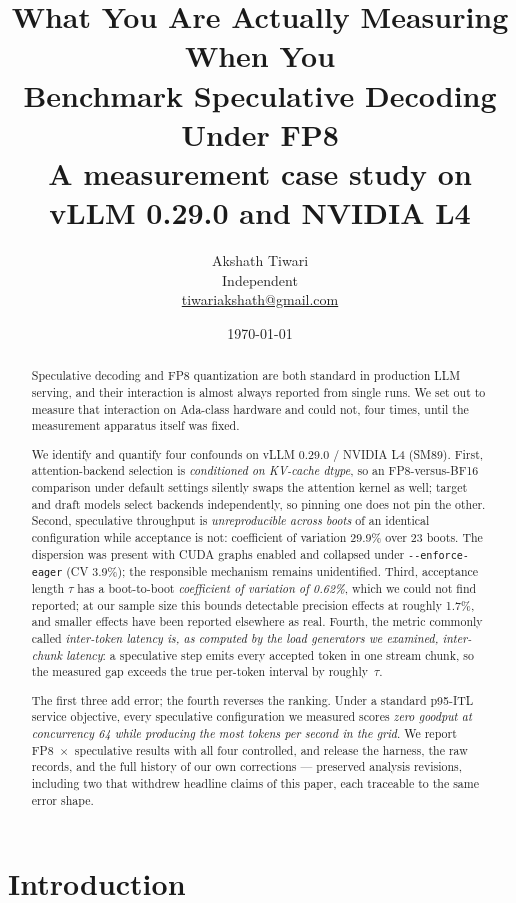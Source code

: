 \documentclass[11pt]{article}
\title{\bfseries What You Are Actually Measuring When You\\Benchmark Speculative Decoding Under FP8\\[0.3em]
\large\normalfont A measurement case study on vLLM 0.29.0 and NVIDIA L4}
\author{%
  Akshath Tiwari\\
  \small Independent\\
  \small \href{mailto:tiwariakshath@gmail.com}{tiwariakshath@gmail.com}
}
\date{\today}
\newcommand{\tw}[1]{\texttt{\small #1}}
\begin{document}
\maketitle

\begin{abstract}
\noindent
Speculative decoding and FP8 quantization are both standard in production
LLM serving, and their interaction is almost always reported from single
runs. We set out to measure that interaction on Ada-class hardware and
could not, four times, until the measurement apparatus itself was fixed.

We identify and quantify four confounds on vLLM 0.29.0 / NVIDIA L4 (SM89).
First, attention-backend selection is \emph{conditioned on KV-cache dtype},
so an FP8-versus-BF16 comparison under default settings silently swaps the
attention kernel as well; target and draft models select backends
independently, so pinning one does not pin the other. Second, speculative
throughput is \emph{unreproducible across boots} of an identical
configuration while acceptance is not: coefficient of variation 29.9\% over
23 boots. The dispersion was present with CUDA graphs enabled and collapsed
under \tw{-{}-enforce-eager} (CV 3.9\%); the responsible mechanism remains
unidentified. Third, acceptance
length $\tau$ has a boot-to-boot \emph{coefficient of variation of 0.62\%},
which we could not find reported; at our sample size this bounds detectable
precision effects at roughly 1.7\%, and smaller effects have been reported
elsewhere as real.
Fourth, the metric commonly called \emph{inter-token latency is, as
computed by the load generators we examined, inter-chunk latency}: a speculative step emits every accepted token in one
stream chunk, so the measured gap exceeds the true per-token interval by
roughly~$\tau$.

The first three add error; the fourth reverses the ranking. Under a standard
p95-ITL service objective, every speculative configuration we measured
scores \emph{zero goodput at concurrency 64 while producing the most tokens
per second in the grid}. We report FP8~$\times$~speculative results with all
four controlled, and release the harness, the raw records, and the full
history of our own corrections --- preserved analysis revisions, including
two that withdrew headline claims of this paper, each traceable to the same
error shape.
\end{abstract}

\section{Introduction}
\end{document}
